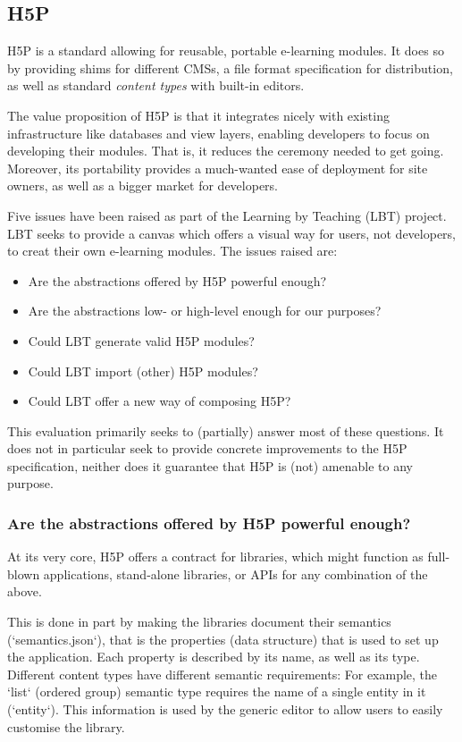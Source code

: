 \subsection{H5P}

H5P is a standard allowing for reusable, portable e-learning modules. It does so
by providing shims for different CMSs, a file format specification for
distribution, as well as standard \textit{content types} with built-in editors.

The value proposition of H5P is that it integrates nicely with existing
infrastructure like databases and view layers, enabling developers to focus on
developing their modules.\cite{h5pwhy} That is, it reduces the ceremony needed
to get going. Moreover, its portability provides a much-wanted ease of
deployment for site owners, as well as a bigger market for developers.

Five issues have been raised as part of the Learning by Teaching (LBT) project.
LBT seeks to provide a canvas which offers a visual way for users, not
developers, to creat their own e-learning modules. The issues raised are:

\begin{itemize}
\item Are the abstractions offered by H5P powerful enough?
\item Are the abstractions low- or high-level enough for our purposes?
\item Could LBT generate valid H5P modules?
\item Could LBT import (other) H5P modules?
\item Could LBT offer a new way of composing H5P?
\end{itemize}

This evaluation primarily seeks to (partially) answer most of these questions.
It does not in particular seek to provide concrete improvements to the H5P
specification, neither does it guarantee that H5P is (not) amenable to any
purpose.

\subsubsection{Are the abstractions offered by H5P powerful enough?}

At its very core, H5P offers a contract for libraries, which might function as
full-blown applications, stand-alone libraries, or APIs for any combination of
the above. 

This is done in part by making the libraries document their semantics
(`semantics.json`), that is the properties (data structure) that is used to set
up the application. Each property is described by its name, as well as its type.
Different content types have different semantic requirements: For example, the
`list` (ordered group) semantic type requires the name of a single entity in it
(`entity`). This information is used by the generic editor to allow users to
easily customise the library.

